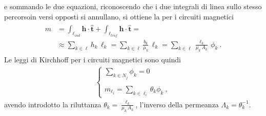 \documentclass[letterpaper,10pt,english]{jupyterBook}
\begin{document}
\sphinxAtStartPar
e sommando le due equazioni, riconoscendo che i due integrali di linea sullo stesso percorsoin versi opposti si annullano, si ottiene la  per i circuiti magnetici
\begin{equation*}
\begin{split}\begin{aligned}
  m & = \int_{\ell_{ind}} \mathbf{h} \cdot \hat{\mathbf{t}} + \int_{\ell_{traf}} \mathbf{h} \cdot \hat{\mathbf{t}} = \\
    & \approx \sum_{k \in \ell} h_k \, \ell_k 
      = \sum_{k \in \ell} \frac{b_k}{\mu_k} \, \ell_k 
      = \sum_{k \in \ell} \frac{\ell_k}{\mu_k \, A_k} \, \phi_k  \ .
\end{aligned}\end{split}
\end{equation*}
\sphinxAtStartPar
Le leggi di Kirchhoff per i circuiti magnetici sono quindi
\begin{equation*}
\begin{split}\begin{cases}
  \sum_{k \in N_j} \phi_k = 0 \\ \\
  m_{\ell_i} = \sum_{k \in \ell_i} \theta_k \phi_k \ ,
\end{cases}\end{split}
\end{equation*}
\sphinxAtStartPar
avendo introdotto la riluttanza \(\theta_k = \frac{\ell_k}{\mu_k \, A_k}\), l’inverso della permeanza \(\Lambda_k = \theta_k^{-1}\).

\sphinxstepscope
\end{document}
